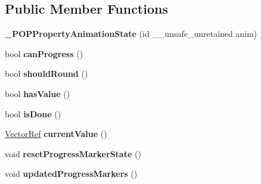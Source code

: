 \subsection*{Public Member Functions}
\begin{DoxyCompactItemize}
\item 
\mbox{\label{struct___p_o_p_property_animation_state_a2db9bc7e6545036aad9bedb83d26cbb5}} 
{\bfseries \+\_\+\+P\+O\+P\+Property\+Animation\+State} (id \+\_\+\+\_\+unsafe\+\_\+unretained anim)
\item 
\mbox{\label{struct___p_o_p_property_animation_state_a6e78a082cb2b8c449f881580df7a932d}} 
bool {\bfseries can\+Progress} ()
\item 
\mbox{\label{struct___p_o_p_property_animation_state_a1cb7ff64b1d59dd4b994892ed7427ded}} 
bool {\bfseries should\+Round} ()
\item 
\mbox{\label{struct___p_o_p_property_animation_state_afc0f271a12a8e8bb9dba053edb9624a0}} 
bool {\bfseries has\+Value} ()
\item 
\mbox{\label{struct___p_o_p_property_animation_state_a2b53a2e063ee3fd9903cc2f17f53aaa7}} 
bool {\bfseries is\+Done} ()
\item 
\mbox{\label{struct___p_o_p_property_animation_state_a6405396c01ff7d574bd1f856d4601e81}} 
\mbox{\hyperlink{namespace_p_o_p_ae9f6819a2172ed569526091e357712f5}{Vector\+Ref}} {\bfseries current\+Value} ()
\item 
\mbox{\label{struct___p_o_p_property_animation_state_af564c4c8b5a8c3770a30d9e49e5021f4}} 
void {\bfseries reset\+Progress\+Marker\+State} ()
\item 
\mbox{\label{struct___p_o_p_property_animation_state_a521a1952536f708419f0f00e1cbb8b5b}} 
void {\bfseries updated\+Progress\+Markers} ()
\item 
\mbox{\label{struct___p_o_p_property_animation_state_aa57360422c9332c2328a2d1aa5f4aa45}} 

\end{DoxyCompactItemize}
